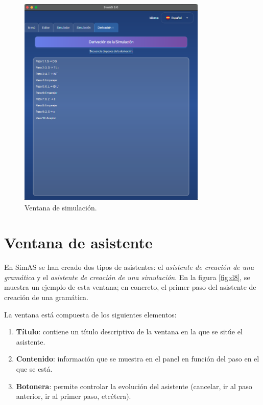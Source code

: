 \begin{figure}[htp]
\centering
	\includegraphics[width=0.8\textwidth]{figuras2/simulador/simulacion_derivacion.png}
	\caption{Ventana de simulación.}
	\label{fig:da24}
\end{figure}

\section{Ventana de asistente}

En SimAS se han creado dos tipos de asistentes: el \textit{asistente de creación de una gramática} y el \textit{asistente de creación de una simulación}. En la figura \ref{fig:d8}, se muestra un ejemplo de esta ventana; en concreto, el primer paso del asistente de creación de una gramática.

La ventana está compuesta de los siguientes elementos:
\begin{enumerate}
 \item \textbf{Título}: contiene un título descriptivo de la ventana en la que se sitúe el asistente.
 \item \textbf{Contenido}: información que se muestra en el panel en función del paso en el que se está.
 \item \textbf{Botonera}: permite controlar la evolución del asistente (cancelar, ir al paso anterior, ir al primer paso, etcétera).
\end{enumerate}

